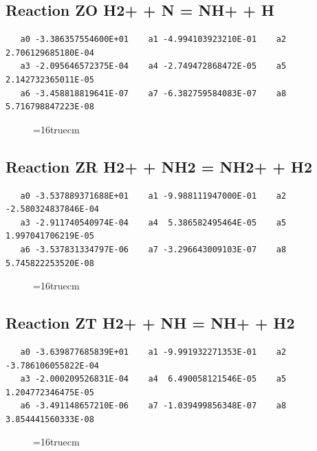 \documentclass[12pt,dvipdfm]{article}
\begin{document}
\subsection{
Reaction ZO H2+ + N = NH+ + H}
\begin{small}\begin{verbatim}
   a0 -3.386357554600E+01    a1 -4.994103923210E-01    a2  2.706129685180E-04
   a3 -2.095646572375E-04    a4 -2.749472868472E-05    a5  2.142732365011E-05
   a6 -3.458818819641E-07    a7 -6.382759584083E-07    a8  5.716798847223E-08
   \end{verbatim}\end{small}
\begin{figure}[h!] \label{n2rates}
\epsfxsize=16truecm
\end{figure}
\newpage

\subsection{
Reaction ZR H2+ + NH2 = NH2+ + H2}
\begin{small}\begin{verbatim}
   a0 -3.537889371688E+01    a1 -9.988111947000E-01    a2 -2.580324837846E-04
   a3 -2.911740540974E-04    a4  5.386582495464E-05    a5  1.997041706219E-05
   a6 -3.537831334797E-06    a7 -3.296643009103E-07    a8  5.745822253520E-08
   \end{verbatim}\end{small}
\begin{figure}[h!] \label{n2rates}
\epsfxsize=16truecm
\end{figure}
\newpage

\subsection{
Reaction ZT H2+ + NH = NH+ + H2}
\begin{small}\begin{verbatim}
   a0 -3.639877685839E+01    a1 -9.991932271353E-01    a2 -3.786106055822E-04
   a3 -2.000209526831E-04    a4  6.490058121546E-05    a5  1.204772346475E-05
   a6 -3.491148657210E-06    a7 -1.039499856348E-07    a8  3.854441560333E-08
   \end{verbatim}\end{small}
\begin{figure}[h!] \label{n2rates}
\epsfxsize=16truecm
\end{figure}
\newpage
\end{document}
